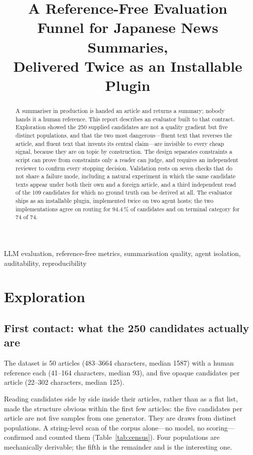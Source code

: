 \documentclass[conference]{IEEEtran}
\title{A Reference-Free Evaluation Funnel for Japanese News Summaries,\\
Delivered Twice as an Installable Plugin}
\author{\IEEEauthorblockN{Chen Jinhua}
\IEEEauthorblockA{AI Quality Scientist Take-Home Assignment\\
50 XL-Sum Japanese articles, 250 candidate summaries}}
\begin{document}
\maketitle

\begin{abstract}
A summariser in production is handed an article and returns a summary; nobody hands it a human reference. This report describes an evaluator built to that contract. Exploration showed the 250 supplied candidates are not a quality gradient but five distinct populations, and that the two most dangerous---fluent text that reverses the article, and fluent text that invents its central claim---are invisible to every cheap signal, because they are on topic by construction. The design separates constraints a script can prove from constraints only a reader can judge, and requires an independent reviewer to confirm every stopping decision. Validation rests on seven checks that do not share a failure mode, including a natural experiment in which the same candidate texts appear under both their own and a foreign article, and a third independent read of the 109 candidates for which no ground truth can be derived at all. The evaluator ships as an installable plugin, implemented twice on two agent hosts; the two implementations agree on routing for 94.4\,\% of candidates and on terminal category for 74 of 74.
\end{abstract}

\begin{IEEEkeywords}
LLM evaluation, reference-free metrics, summarisation quality, agent isolation, auditability, reproducibility
\end{IEEEkeywords}

\section{Exploration}

\subsection{First contact: what the 250 candidates actually are}
The dataset is 50 articles (483--3664 characters, median 1587) with a
human reference each (41--164 characters, median 93), and five opaque
candidates per article (22--302 characters, median 125).

Reading candidates side by side inside their articles, rather than as a
flat list, made the structure obvious within the first few articles: the
five candidates per article are not five samples from one generator.
They are draws from distinct populations. A string-level scan
of the corpus alone---no model, no scoring---confirmed and counted them
(Table~\ref{tab:census}). Four populations are mechanically derivable;
the fifth is the remainder and is the interesting one.
\end{document}
